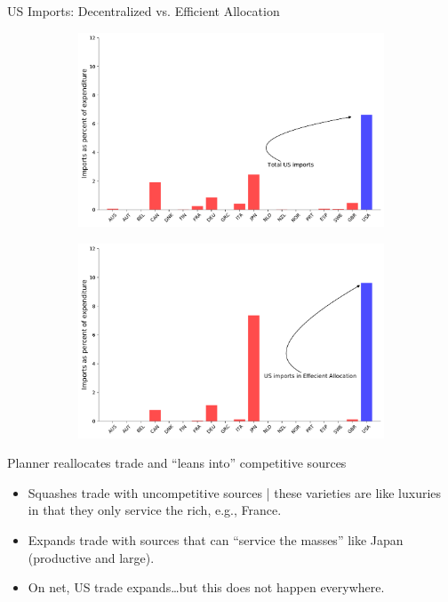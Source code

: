 \documentclass[9pt,pdftex,aspectratio=1610]{beamer}
\theoremstyle{definition}
\begin{document}
\begin{frame}[t]{US Imports: Decentralized vs. Efficient Allocation}

\begin{figure}[!t]
\begin{subfigure}{}
    \includegraphics[scale = 0.26]{../notes/figures/decentralized-trade-us.pdf}
\end{subfigure}
\begin{subfigure}{}
    \includegraphics[scale = 0.26]{../notes/figures/planner-trade-us.pdf}
\end{subfigure}
\end{figure}
\bigskip
Planner reallocates trade and ``leans into'' competitive sources
\begin{itemize}
\smallskip
\item Squashes trade with uncompetitive sources | these varieties are like luxuries in that they only service the rich, e.g., France.
\smallskip
\item Expands trade with sources that can ``service the masses'' like Japan (productive and large).
\smallskip
\item On net, US trade expands\ldots but this does not happen everywhere.
\end{itemize}
\end{frame}
\end{document}
